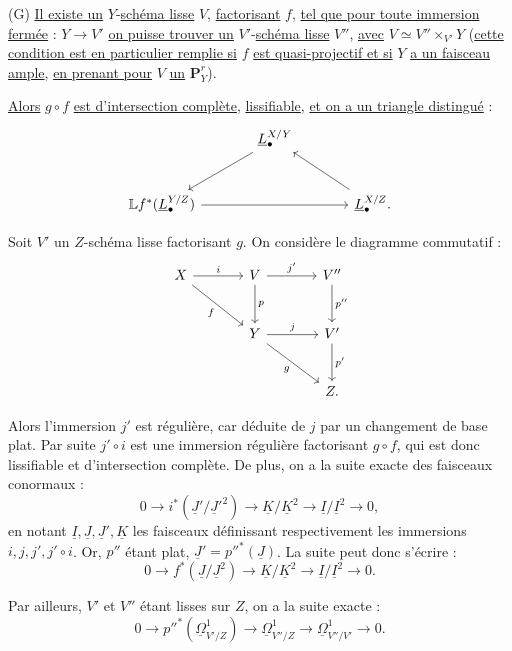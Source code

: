 
(G) \uline{Il
existe un} $Y$-\uline{schéma lisse} $V$, \uline{factorisant} $f$, \uline{tel que pour toute immersion fermée} : $Y\to V'$ \uline{on puisse trouver un} $V'$-\uline{schéma lisse} $V''$, \uline{avec} $V\simeq V''\times_{V'}Y$ (\uline{cette condition est en particulier remplie si} $f$ \uline{est quasi-projectif et si} $Y$ \uline{a un faisceau ample}, \uline{en prenant pour} $V$ \uline{un} $\mathbf{P}^r_Y$).

\uline{Alors} $g\circ f$ \uline{est d'intersection complète}, \uline{lissifiable}, \uline{et on a un triangle distingué} :
\[
\begin{tikzcd}[column sep=large,row sep=large]
& \underline{L}^{X/Y}_\bullet \arrow[dl] \\
\mathbb Lf^*(\underline{L}^{Y/Z}_\bullet) \arrow[rr] && \underline{L}^{X/Z}_\bullet . \arrow[ul]
\end{tikzcd}
\]

Soit $V'$ un $Z$-schéma lisse factorisant $g$. On considère le diagramme commutatif :
\[
\begin{tikzcd}[column sep=large,row sep=large]
X \arrow[r,"i"] \arrow[dr,"f"'] & V \arrow[r,"j'"] \arrow[d,"p"] & V'' \arrow[d,"p''"]\\
& Y \arrow[r,"j"] \arrow[dr,"g"'] & V' \arrow[d,"p'"]\\
& & Z .
\end{tikzcd}
\]

Alors l'immersion $j'$ est régulière, car déduite de $j$ par un changement de base plat. Par suite $j'\circ i$ est une immersion régulière factorisant $g\circ f$, qui est donc lissifiable et d'intersection complète. De plus, on a la suite exacte des faisceaux conormaux :
\[
0\longrightarrow i^*(\underline{J}'/\underline{J}'^2)\longrightarrow \underline{K}/\underline{K}^2\longrightarrow \underline{I}/\underline{I}^2\longrightarrow0,
\]
en notant $\underline{I},\underline{J},\underline{J}',\underline{K}$ les faisceaux définissant respectivement les immersions $i,j,j',j'\circ i$. Or, $p''$ étant plat, $\underline{J}'=p''^*(\underline{J})$. La suite peut donc s'écrire :
\begin{equation}\tag{2.6.1}
0\longrightarrow f^*(\underline{J}/\underline{J}^2)\longrightarrow \underline{K}/\underline{K}^2\longrightarrow \underline{I}/\underline{I}^2\longrightarrow0.
\end{equation}

Par ailleurs, $V'$ et $V''$ étant lisses sur $Z$, on a la suite exacte :
\[
0\longrightarrow p''^*(\underline{\Omega}^1_{V'/Z})\longrightarrow\underline{\Omega}^1_{V''/Z}\longrightarrow\underline{\Omega}^1_{V''/V'}\longrightarrow0.
\]
